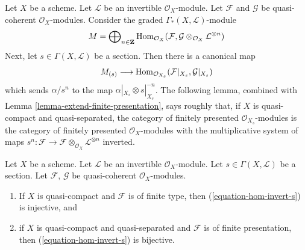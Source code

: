 \noindent
Let $X$ be a scheme. Let $\mathcal{L}$ be an invertible $\mathcal{O}_X$-module.
Let $\mathcal{F}$ and $\mathcal{G}$ be quasi-coherent $\mathcal{O}_X$-modules.
Consider the graded $\Gamma_*(X, \mathcal{L})$-module
$$
M = \bigoplus\nolimits_{n \in \mathbf{Z}} \mathop{\mathrm{Hom}}\nolimits_{\mathcal{O}_X}(\mathcal{F},
\mathcal{G} \otimes_{\mathcal{O}_X} \mathcal{L}^{\otimes n})
$$
Next, let $s \in \Gamma(X, \mathcal{L})$ be a section. Then there is a
canonical map
\begin{equation}
\label{equation-hom-invert-s}
M_{(s)} \longrightarrow
\mathop{\mathrm{Hom}}\nolimits_{\mathcal{O}_{X_s}}(\mathcal{F}|_{X_s}, \mathcal{G}|_{X_s})
\end{equation}
which sends $\alpha/s^n$ to the map $\alpha|_{X_s} \otimes s|_{X_s}^{-n}$.
The following lemma, combined with
Lemma \ref{lemma-extend-finite-presentation},
says roughly that, if $X$ is quasi-compact and quasi-separated,
the category of finitely presented $\mathcal{O}_{X_s}$-modules
is the category of finitely presented $\mathcal{O}_X$-modules
with the multiplicative system of maps
$s^n: \mathcal{F} \to
\mathcal{F} \otimes_{\mathcal{O}_X} \mathcal{L}^{\otimes n}$ inverted.

\begin{lemma}
\label{lemma-section-maps-backwards}
Let $X$ be a scheme. Let $\mathcal{L}$ be an invertible $\mathcal{O}_X$-module.
Let $s \in \Gamma(X, \mathcal{L})$ be a section.
Let $\mathcal{F}$, $\mathcal{G}$ be quasi-coherent $\mathcal{O}_X$-modules.
\begin{enumerate}
\item If $X$ is quasi-compact and $\mathcal{F}$ is of finite type,
then (\ref{equation-hom-invert-s}) is injective, and
\item if $X$ is quasi-compact and quasi-separated and $\mathcal{F}$
is of finite presentation, then
(\ref{equation-hom-invert-s})
is bijective.
\end{enumerate}
\end{lemma}

